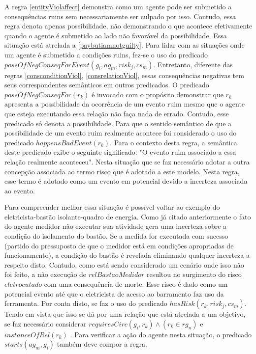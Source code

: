 A regra \ref{entityViolaffect} demonstra como um agente pode ser submetido a consequências ruins sem necessariamente ser culpado por isso. Contudo, essa regra denota apenas possibilidade, não demonstrando o que acontece efetivamente quando o agente é submetido ao lado não favorável da possibilidade. Essa situação está atrelada a \ref{paybutiamnotguilty}. Para lidar com as situações onde um agente é submetido a condições ruins, fez-se o uso do predicado $possOfNegConseqForEvent(g_i,ag_m,risk_j,cs_m) $. Entretanto, diferente das regras \ref{consconditionViol}, \ref{consrelationViol}, essas consequências negativas tem seus correspondentes semânticos em outros predicados. O predicado $possOfNegConseqFor(r_k)$ é invocado com o propósito demonstrar que $r_k$ apresenta a possibilidade da ocorrência de um evento ruim mesmo que o agente que esteja executando essa relação não faça nada de errado. Contudo, esse predicado só denota a possibilidade. Para que o sentido semântico de que a possibilidade de um evento ruim realmente acontece foi considerado o uso do predicado $happensBadEvent(r_k)$. Para o contexto desta regra, a semântica deste predicado exibe o seguinte significado: "O evento ruim associado a essa relação realmente aconteceu". Nesta situação que se faz necessário adotar a outra concepção associada ao termo risco que é adotado a este modelo. Nesta regra, esse termo é adotado como um evento em potencial devido a incerteza associada ao evento. 

Para compreender melhor essa situação é possível voltar ao exemplo do eletricista-bastão isolante-quadro de energia. Como já citado anteriormente o fato do agente medidor não executar sua atividade gera uma incerteza sobre a condição do isolamento do bastão. Se a medida for executada com sucesso (partido do pressuposto de que o medidor está em condições apropriadas de funcionamento), a condição do bastão é revelada eliminando qualquer incerteza a respeito disto. Contudo, como está sendo considerado um cenário onde isso não foi feito, a não execução de $relBastaoMedidor$ resultou no surgimento do risco $eletrocutado$ com uma consequência de morte. Esse risco é dado como um potencial evento até que o eletricista de acesso ao barramento faz uso da ferramenta. Por conta disto, se faz o uso do predicado $hasRisk(r_k,risk_j,cs_m)$. Tendo em vista que isso se dá por uma relação que está atrelada a um objetivo, se faz necessário considerar $requiresCirc(g_i,r_k) \wedge (r_k \in rg_n) $ e  $instanceOfRel(r_k)$ . Para verificar a ação do agente nesta situação, o predicado $starts(ag_m,g_i)$ também deve compor a regra.


